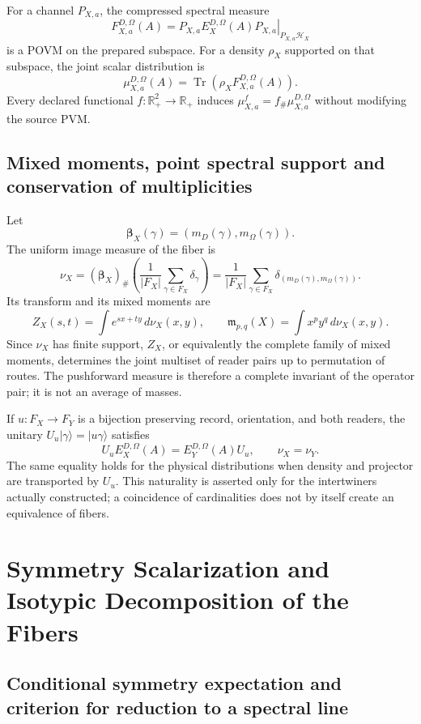 For a channel \(P_{X,a}\), the compressed spectral measure
\[
 F_{X,a}^{D,\Omega}(A)
 =\left.P_{X,a}E_X^{D,\Omega}(A)P_{X,a}\right|_{P_{X,a}\mathcal H_X}
\]
is a POVM on the prepared subspace. For a density \(\rho_X\)
supported on that subspace, the joint scalar distribution is
\[
 \mu_{X,a}^{D,\Omega}(A)
 =\operatorname{Tr}\!\left(
 \rho_X F_{X,a}^{D,\Omega}(A)
 \right).
\]
Every declared functional \(f:\mathbb R_+^2\to\mathbb R_+\) induces
\(\mu_{X,a}^f=f_\#\mu_{X,a}^{D,\Omega}\) without modifying the source PVM.

\subsection{Mixed moments, point spectral support and conservation of multiplicities}

Let
\[
 \boldsymbol\beta_X(\gamma)
 =(m_D(\gamma),m_\Omega(\gamma)).
\]
The uniform image measure of the fiber is
\[
 \nu_X=(\boldsymbol\beta_X)_\#
 \left(\frac1{|F_X|}\sum_{\gamma\in F_X}\delta_\gamma\right)
 =\frac1{|F_X|}\sum_{\gamma\in F_X}
 \delta_{(m_D(\gamma),m_\Omega(\gamma))}.
\]
Its transform and its mixed moments are
\[
 Z_X(s,t)=\int e^{sx+ty}\,d\nu_X(x,y),
 \qquad
 \mathfrak m_{p,q}(X)=\int x^py^q\,d\nu_X(x,y).
\]
Since \(\nu_X\) has finite support, \(Z_X\), or equivalently the complete
family of mixed moments, determines the joint multiset of reader pairs
up to permutation of routes. The pushforward measure is therefore a
complete invariant of the operator pair; it is not an average of masses.

If \(u:F_X\to F_Y\) is a bijection preserving record, orientation, and
both readers, the unitary \(U_u|\gamma\rangle=|u\gamma\rangle\) satisfies
\[
 U_uE_X^{D,\Omega}(A)=E_Y^{D,\Omega}(A)U_u,
 \qquad
 \nu_X=\nu_Y.
\]
The same equality holds for the physical distributions when density and
projector are transported by \(U_u\). This naturality is asserted only for
the intertwiners actually constructed; a coincidence of
cardinalities does not by itself create an equivalence of fibers.

\section{Symmetry Scalarization and Isotypic Decomposition of the Fibers}

\subsection{Conditional symmetry expectation and criterion for reduction to a spectral line}

